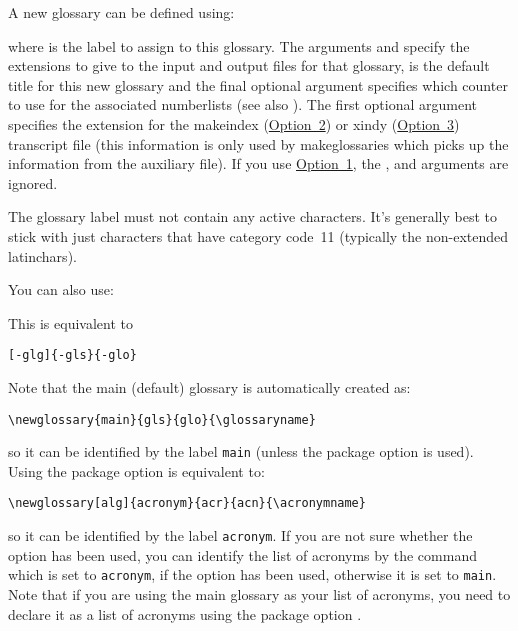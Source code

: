 \documentclass[report,inlinetitle]{nlctdoc}
\newcommand*{\opt}[1]{\hyperlink{option#1}{Option~#1}}
\begin{document}
A new glossary can be defined using:
\begin{definition}[\DescribeMacro{\newglossary}]
\linebreak{}
\end{definition}
where  is the label to assign to this glossary. The
arguments  and  specify the extensions to
give to the input and output files for that glossary, 
is the default title for this new glossary and the final optional
argument  specifies which counter to use for the
associated \glspl{numberlist} (see also
). The first optional argument specifies
the extension for the \gls{makeindex} (\opt2) or \gls{xindy} (\opt3)
transcript file (this information is only used by
\gls{makeglossaries} which picks up the information from the
auxiliary file).  If you use \opt1, the ,
 and  arguments are ignored.

\begin{important}
The glossary label  must not contain any active
characters. It's generally best to stick with just characters that
have category code~11 (typically the non-extended \glspl{latinchar}).
\end{important}

You can also use:
\begin{definition}[\DescribeMacro{\altnewglossary}]
\end{definition}
This is equivalent to
\begin{alltt}
[-glg]\{-gls\}\{-glo\}
\end{alltt}

Note that the main (default) glossary is automatically created as:
\begin{verbatim}
\newglossary{main}{gls}{glo}{\glossaryname}
\end{verbatim}
so it can be identified by the label \texttt{main} (unless the
 package option is used). Using the
 package option is equivalent to:
\begin{verbatim}
\newglossary[alg]{acronym}{acr}{acn}{\acronymname}
\end{verbatim}
so it can be identified by the label \texttt{acronym}. If you are
not sure whether the  option has been used, you
can identify the list of acronyms by the command 
\DescribeMacro{\acronymtype} which is set to
\texttt{acronym}, if the  option has been used,
otherwise it is set to \texttt{main}. Note that if you are using
the main glossary as your list of acronyms, you need to declare
it as a list of acronyms using the package option 
.
\end{document}
